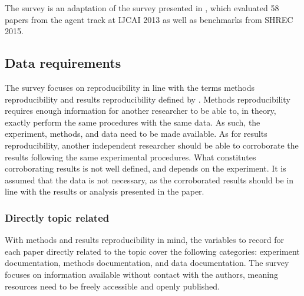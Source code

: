The survey is an adaptation of the survey presented in \cite{Gundersen2015}, which evaluated 58 papers from the agent track at IJCAI 2013 as well as benchmarks from SHREC 2015.

\subsection{Data requirements}
\label{subsec:data-req}
The survey focuses on reproducibility in line with the terms methods reproducibility and results reproducibility defined by \cite{Goodman341ps12}. Methods reproducibility requires enough information for another researcher to be able to, in theory, exactly perform the same procedures with the same data. As such, the experiment, methods, and data need to be made available. As for results reproducibility, another independent researcher should be able to corroborate the results following the same experimental procedures. What constitutes corroborating results is not well defined, and depends on the experiment. It is assumed that the data is not necessary, as the corroborated results should be in line with the results or analysis presented in the paper.

\subsubsection{Directly topic related}
With methods and results reproducibility in mind, the variables to record for each paper directly related to the topic cover the following categories: experiment documentation, methods documentation, and data documentation. The survey focuses on information available without contact with the authors, meaning resources need to be freely accessible and openly published.

